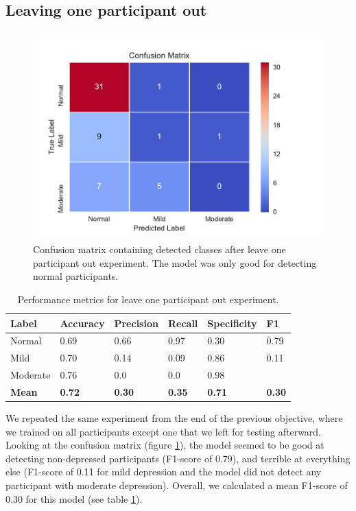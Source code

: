 \subsection{Leaving one participant out}

\begin{figure}[h]
\begin{center}
      \includegraphics[height=8cm]{img/depression_class/leave_one_out.pdf}
      \caption{Confusion matrix containing detected classes after leave one participant out experiment. The model was only good for detecting normal participants.}
      \label{figure:depression_class_conf_loo}
\end{center}
\end{figure}

\begin{table}[h]
\begin{center}
      \begin{tabular}{|l|l|l|l|l|l|}
            \hline
            \bfseries Label & \bfseries Accuracy & \bfseries Precision & \bfseries Recall & \bfseries Specificity & \bfseries F1 \\\hline
            Normal & 0.69 & 0.66 & 0.97 & 0.30 & 0.79 \\\hline
            Mild & 0.70 & 0.14 & 0.09 & 0.86 & 0.11 \\\hline
            Moderate & 0.76 & 0.0 & 0.0 & 0.98 &  \\\hline
            \bfseries Mean & \bfseries 0.72 & \bfseries 0.30 & \bfseries 0.35 & \bfseries 0.71 & \bfseries 0.30 \\\hline
      \end{tabular}
      \caption{Performance metrics for leave one participant out experiment.}
      \label{table:depression_class_performance_loo}
\end{center}
\end{table}
We repeated the same experiment from the end of the previous objective, where we trained on all participants except one that we left for testing afterward. Looking at the confusion matrix (figure \ref{figure:depression_class_conf_loo}), the model seemed to be good at detecting non-depressed participants (F1-score of 0.79), and terrible at everything else (F1-score of 0.11 for mild depression and the model did not detect any participant with moderate depression). Overall, we calculated a mean F1-score of 0.30 for this model (see table \ref{table:depression_class_performance_loo}). 


